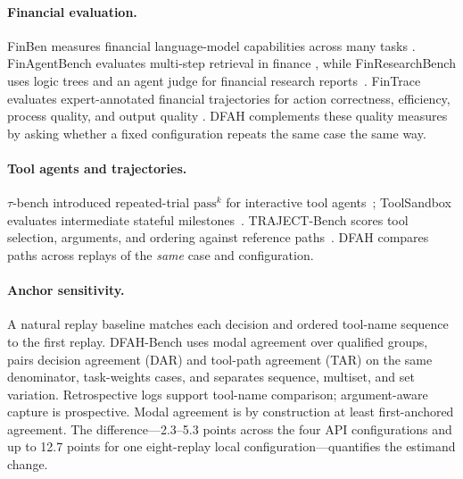 \documentclass{article}
\begin{document}
\paragraph{Financial evaluation.}
FinBen measures financial language-model capabilities across many tasks
\citep{xie2024finben}.  FinAgentBench evaluates multi-step retrieval in finance
\citep{choi2025finagentbench}, while FinResearchBench uses logic trees and an
agent judge for financial research reports~\citep{sun2025finresearchbench}.
FinTrace evaluates expert-annotated financial trajectories for action
correctness, efficiency, process quality, and output quality
\citep{cao2026fintrace}. DFAH complements these quality measures by asking
whether a fixed configuration repeats the same case the same way.

\paragraph{Tool agents and trajectories.}
$\tau$-bench introduced repeated-trial \(\mathrm{pass}^k\) for interactive
tool agents~\citep{yao2024taubench}; ToolSandbox evaluates intermediate stateful
milestones~\citep{lu2025toolsandbox}.  TRAJECT-Bench scores tool selection,
arguments, and ordering against reference paths~\citep{he2026traject}. DFAH
compares paths across replays of the \emph{same} case and configuration.

\paragraph{Anchor sensitivity.}
A natural replay baseline matches each decision and ordered tool-name sequence
to the first replay. DFAH-Bench uses modal agreement over qualified groups,
pairs decision agreement (DAR) and tool-path agreement (TAR) on the same
denominator, task-weights cases, and separates
sequence, multiset, and set variation. Retrospective logs support tool-name
comparison; argument-aware capture is prospective. Modal agreement is by
construction at least first-anchored agreement.
The difference---2.3--5.3 points across the four API configurations and up to
12.7 points for one eight-replay local configuration---quantifies the estimand
change.
\end{document}
